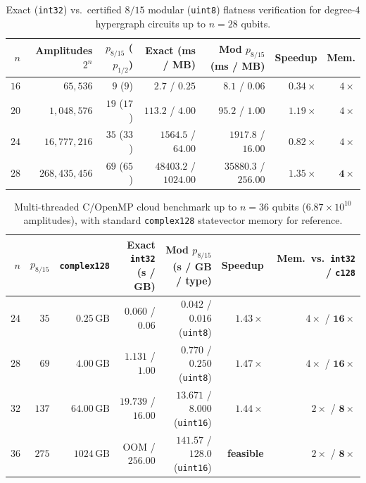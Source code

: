 \documentclass[11pt,a4paper]{article}
\begin{document}
\begin{table}[h]
\centering
\footnotesize
\setlength{\tabcolsep}{4pt}
\caption{Exact (\texttt{int32}) vs.\ certified $8/15$ modular (\texttt{uint8}) flatness verification for degree-$4$ hypergraph circuits up to $n=28$ qubits.}
\label{tab:bench}
\begin{tabular}{rrrrrrr}
\toprule
$n$ & Amplitudes $2^n$ & $p_{8/15}$ ($p_{1/2}$) & Exact (ms / MB) & Mod $p_{8/15}$ (ms / MB) & Speedup & Mem. \\
\midrule
$16$ & $65{,}536$       & $9$ ($9$)   & $2.7$ / $0.25$       & $8.1$ / $0.06$      & $0.34\times$ & $4\times$ \\
$20$ & $1{,}048{,}576$  & $19$ ($17$) & $113.2$ / $4.00$     & $95.2$ / $1.00$     & $1.19\times$ & $4\times$ \\
$24$ & $16{,}777{,}216$ & $35$ ($33$) & $1564.5$ / $64.00$   & $1917.8$ / $16.00$  & $0.82\times$ & $4\times$ \\
$28$ & $268{,}435{,}456$& $69$ ($65$) & $48403.2$ / $1024.00$& $35880.3$ / $256.00$& $\mathbf{1.35\times}$ & $\mathbf{4\times}$ \\
\bottomrule
\end{tabular}
\end{table}

\begin{table}[h]
\centering
\footnotesize
\setlength{\tabcolsep}{3.2pt}
\caption{Multi-threaded C/OpenMP cloud benchmark up to $n = 36$ qubits ($6.87 \times 10^{10}$ amplitudes), with standard \texttt{complex128} statevector memory for reference.}
\label{tab:omp32}
\begin{tabular}{rrrrrrr}
\toprule
$n$ & $p_{8/15}$ & \texttt{complex128} & Exact \texttt{int32} (s / GB) & Mod $p_{8/15}$ (s / GB / type) & Speedup & Mem.\ vs.\ \texttt{int32} / \texttt{c128} \\
\midrule
$24$ & $35$  & $0.25\,\text{GB}$  & $0.060$ / $0.06$  & $0.042$ / $0.016$ (\texttt{uint8})  & $\mathbf{1.43\times}$ & $4\times$ / $\mathbf{16\times}$ \\
$28$ & $69$  & $4.00\,\text{GB}$  & $1.131$ / $1.00$  & $0.770$ / $0.250$ (\texttt{uint8})  & $\mathbf{1.47\times}$ & $4\times$ / $\mathbf{16\times}$ \\
$32$ & $137$ & $64.00\,\text{GB}$ & $19.739$ / $16.00$& $13.671$ / $8.000$ (\texttt{uint16})& $\mathbf{1.44\times}$ & $2\times$ / $\mathbf{8\times}$ \\
$36$ & $275$ & $1024\,\text{GB}$  & OOM / $256.00$    & $\mathbf{141.57}$ / $\mathbf{128.0}$ (\texttt{uint16}) & \textbf{feasible} & $2\times$ / $\mathbf{8\times}$ \\
\bottomrule
\end{tabular}
\end{table}
\end{document}
